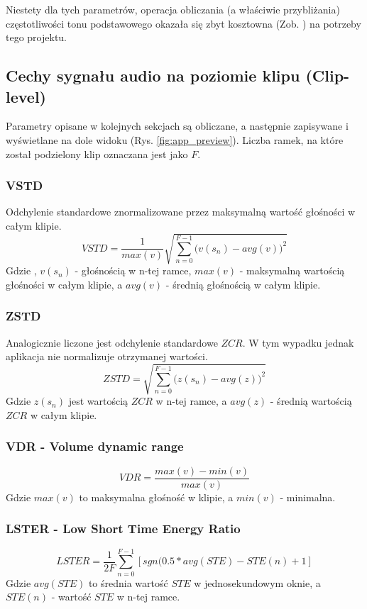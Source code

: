 \documentclass[12pt,a4paper]{article}
\begin{document}
Niestety dla tych parametrów, operacja obliczania (a właściwie przybliżania) częstotliwości tonu
podstawowego okazała się zbyt kosztowna (Zob. \cite{leszczyna}) na potrzeby tego projektu.

\subsection{Cechy sygnału audio na poziomie klipu (Clip-level)\label{sec:cliplevel}}
Parametry opisane w kolejnych sekcjach są obliczane, a następnie zapisywane i wyświetlane na dole
widoku (Rys. \ref{fig:app_preview}). Liczba ramek, na które został podzielony klip oznaczana jest
jako $F$.

\subsubsection{VSTD\label{sec:vstd}}
Odchylenie standardowe znormalizowane przez maksymalną wartość głośności w całym klipie.
\begin{equation}
    VSTD=\frac{1}{max(v)}\sqrt{
        \sum_{n=0}^{F-1}\big(
            v(s_n) - avg(v)
        \big)^2
    }
\end{equation}
Gdzie , $v(s_n)$ - głośnością w n-tej ramce, $max(v)$ - maksymalną wartością głośności w całym
klipie, a $avg(v)$ - średnią głośnością w całym klipie.

\subsubsection{ZSTD\label{sec:zstd}}
Analogicznie liczone jest odchylenie standardowe $ZCR$. W tym wypadku jednak aplikacja nie
normalizuje otrzymanej wartości.
\begin{equation}
    ZSTD=\sqrt{
        \sum_{n=0}^{F-1}\big(
            z(s_n) - avg(z)
        \big)^2
    }
\end{equation}
Gdzie $z(s_n)$ jest wartością $ZCR$ w n-tej ramce, a $avg(z)$ - średnią wartością $ZCR$ w całym
klipie.

\subsubsection{VDR - Volume dynamic range\label{sec:vdr}}
\begin{equation}
VDR=\frac{max(v)-min(v)}{max(v)}
\end{equation}
Gdzie $max(v)$ to maksymalna głośność w klipie, a $min(v)$ - minimalna.

\subsubsection{LSTER - Low Short Time Energy Ratio\label{sec:lster}}
\begin{equation}
    LSTER=\frac{1}{2F}\sum_{n=0}^{F-1}[
        sgn(0.5*avg(STE)-STE(n)+1
    ]
\end{equation}
Gdzie $avg(STE)$ to średnia wartość $STE$ w jednosekundowym oknie, a $STE(n)$ - wartość $STE$ w
n-tej ramce.
\end{document}
